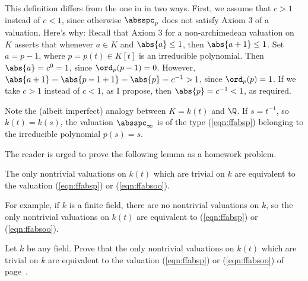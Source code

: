 \documentclass[11pt]{book}
\begin{document}
\begin{ch}
This definition differs from the one in \cite[pg.~46]{cassels:global}
in two ways.  First, we assume that $c>1$ instead of $c<1$, since
otherwise $\absspc_p$ does not satisfy Axiom 3 of a valuation.  Here's
why: Recall that Axiom 3 for a non-archimedean valuation on $K$
asserts that whenever $a\in K$ and $\abs{a}\leq 1$, then
$\abs{a+1}\leq 1$.  Set $a=p-1$, where $p=p(t)\in K[t]$ is an
irreducible polynomial.  Then $\abs{a}=c^0 = 1$, since $\ord_p(p-1) =
0$.  However, $\abs{a+1} = \abs{p-1+1} = \abs{p}=c^{-1}>1$, since
$\ord_p(p) = 1$.  If we take $c>1$ instead of $c<1$, as I propose,
then $\abs{p}=c^{-1}<1$, as required.


Note the (albeit imperfect) analogy between $K=k(t)$ and $\Q$.
If $s=t^{-1}$, so $k(t)=k(s)$, the valuation $\absspc_{\infty}$
is of the type (\ref{eqn:ffabsp}) belonging to the irreducible
polynomial $p(s)=s$.

The reader is urged to prove the following lemma as a homework
problem.
\begin{lemma}
The only nontrivial valuations on $k(t)$ which are trivial
on $k$ are equivalent to the valuation (\ref{eqn:ffabsp})
or (\ref{eqn:ffabsoo}).
\end{lemma}
For example, if $k$ is a finite field, there are no
nontrivial valuations on $k$, so the only
nontrivial valuations on $k(t)$ are equivalent to
(\ref{eqn:ffabsp}) or (\ref{eqn:ffabsoo}).

\begin{exercise} \label{ex:valuations2}
Let $k$ be any field. Prove that the only nontrivial valuations
on $k(t)$ which are trivial on $k$ are equivalent to the valuation
(\ref{eqn:ffabsp}) or (\ref{eqn:ffabsoo}) of page~\pageref{eqn:ffabsp}.
\end{exercise}
\end{ch}
\end{document}
